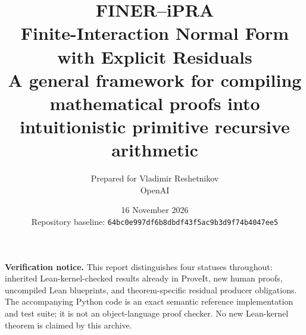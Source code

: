 \documentclass[11pt]{article}
\title{\bfseries FINER--iPRA\\[0.35em]
\Large Finite-Interaction Normal Form with Explicit Residuals\\[0.5em]
\large A general framework for compiling mathematical proofs into intuitionistic primitive recursive arithmetic}
\author{Prepared for Vladimir Reshetnikov\\OpenAI}
\date{16 November 2026\\Repository baseline: \texttt{64bc0e997df6b8dbdf43f5ac9b3d9f74b4047ee5}}
\theoremstyle{remark}
\begin{document}
\maketitle

\begin{abstract}

\end{abstract}

\vspace{0.5em}
\noindent\textbf{Verification notice.}
This report distinguishes four statuses throughout: inherited Lean-kernel-checked results already in ProveIt, new human proofs, uncompiled Lean blueprints, and theorem-specific residual producer obligations.  The accompanying Python code is an exact semantic reference implementation and test suite; it is not an object-language proof checker.  No new Lean-kernel theorem is claimed by this archive.

\tableofcontents
\newpage



















\appendix



\end{document}

